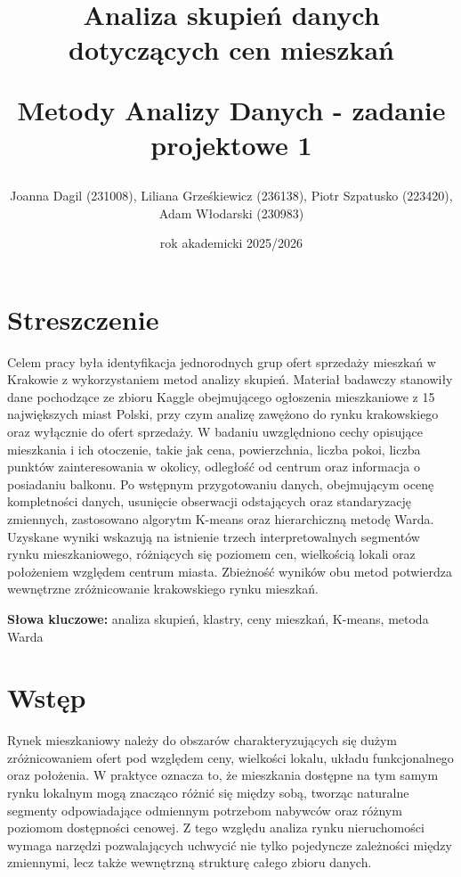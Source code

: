 \documentclass{report}
\title{\LARGE{Analiza skupień danych dotyczących cen mieszkań}

\vspace{0.3cm}

\Large{Metody Analizy Danych - zadanie projektowe 1}}
\author{
Joanna Dagil (231008),
Liliana Grześkiewicz (236138),
Piotr Szpatusko (223420),
Adam Włodarski (230983)
}
\date{rok akademicki 2025/2026}
\begin{document}
\maketitle

\tableofcontents

\chapter*{Streszczenie}

Celem pracy była identyfikacja jednorodnych grup ofert sprzedaży mieszkań w Krakowie z wykorzystaniem metod analizy skupień. 
Materiał badawczy stanowiły dane pochodzące ze zbioru Kaggle obejmującego ogłoszenia mieszkaniowe z 15 największych miast Polski, przy czym analizę zawężono do rynku krakowskiego oraz wyłącznie do ofert sprzedaży. 
W badaniu uwzględniono cechy opisujące mieszkania i ich otoczenie, takie jak cena, powierzchnia, liczba pokoi, liczba punktów zainteresowania w okolicy, odległość od centrum oraz informacja o posiadaniu balkonu. 
Po wstępnym przygotowaniu danych, obejmującym ocenę kompletności danych, usunięcie obserwacji odstających oraz standaryzację zmiennych, zastosowano algorytm K-means oraz hierarchiczną metodę Warda. 
Uzyskane wyniki wskazują na istnienie trzech interpretowalnych segmentów rynku mieszkaniowego, różniących się poziomem cen, wielkością lokali oraz położeniem względem centrum miasta. 
Zbieżność wyników obu metod potwierdza wewnętrzne zróżnicowanie krakowskiego rynku mieszkań.

\vspace{0.5cm}
\noindent\textbf{Słowa kluczowe:} analiza skupień, klastry, ceny mieszkań, K-means, metoda Warda

\chapter{Wstęp}

Rynek mieszkaniowy należy do obszarów charakteryzujących się dużym zróżnicowaniem ofert pod względem ceny, wielkości lokalu, układu funkcjonalnego oraz położenia. 
W praktyce oznacza to, że mieszkania dostępne na tym samym rynku lokalnym mogą znacząco różnić się między sobą, tworząc naturalne segmenty odpowiadające odmiennym potrzebom nabywców oraz różnym poziomom dostępności cenowej. 
Z tego względu analiza rynku nieruchomości wymaga narzędzi pozwalających uchwycić nie tylko pojedyncze zależności między zmiennymi, lecz także wewnętrzną strukturę całego zbioru danych.
\end{document}
